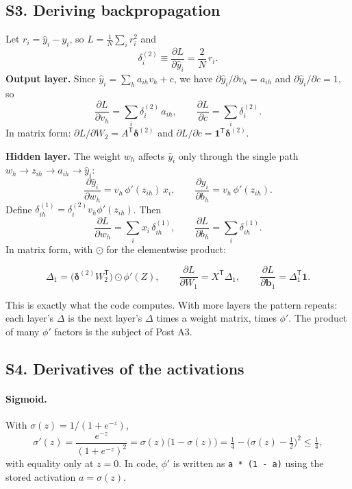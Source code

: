 \documentclass[11pt]{article}
\newcommand{\T}{\mathsf{T}}
\begin{document}
\label{sec:S3}
\subsection*{S3. Deriving backpropagation}
Let $r_i=\hat y_i-y_i$, so $L=\frac1N\sum_ir_i^2$ and
\[
  \delta^{(2)}_i\equiv\frac{\partial L}{\partial\hat y_i}=\frac2N\,r_i .
\]
\textbf{Output layer.} Since $\hat y_i=\sum_ha_{ih}v_h+c$, we have $\partial\hat y_i/\partial v_h=a_{ih}$ and $\partial\hat y_i/\partial c=1$, so
\[
  \frac{\partial L}{\partial v_h}=\sum_i\delta^{(2)}_i\,a_{ih},\qquad
  \frac{\partial L}{\partial c}=\sum_i\delta^{(2)}_i .
\]
In matrix form: $\partial L/\partial W_2=A^{\T}\bm\delta^{(2)}$ and $\partial L/\partial c=\mathbf 1^{\T}\bm\delta^{(2)}$.

\textbf{Hidden layer.} The weight $w_h$ affects $\hat y_i$ only through the single path $w_h\to z_{ih}\to a_{ih}\to\hat y_i$:
\[
  \frac{\partial\hat y_i}{\partial w_h}
  =v_h\,\phi'(z_{ih})\,x_i,
  \qquad
  \frac{\partial\hat y_i}{\partial b_h}
  =v_h\,\phi'(z_{ih}).
\]
Define $\delta^{(1)}_{ih}=\delta^{(2)}_iv_h\phi'(z_{ih})$. Then
\[
  \frac{\partial L}{\partial w_h}=\sum_ix_i\,\delta^{(1)}_{ih},\qquad
  \frac{\partial L}{\partial b_h}=\sum_i\delta^{(1)}_{ih}.
\]
In matrix form, with $\odot$ for the elementwise product:
\begin{mathbox}
\[
  \Delta_1=\big(\bm\delta^{(2)}W_2^{\T}\big)\odot\phi'(Z),\qquad
  \frac{\partial L}{\partial W_1}=X^{\T}\Delta_1,\qquad
  \frac{\partial L}{\partial\mathbf b_1}=\Delta_1^{\T}\mathbf 1 .
\]
\end{mathbox}
This is exactly what the code computes. With more layers the pattern repeats: each layer's $\Delta$ is the next layer's $\Delta$ times a weight matrix, times $\phi'$. The product of many $\phi'$ factors is the subject of Post A3.

\subsection*{S4. Derivatives of the activations}
\paragraph{Sigmoid.} With $\sigma(z)=1/(1+e^{-z})$,
\[
  \sigma'(z)=\frac{e^{-z}}{(1+e^{-z})^2}=\sigma(z)\big(1-\sigma(z)\big)
  =\tfrac14-\big(\sigma(z)-\tfrac12\big)^2\le\tfrac14,
\]
with equality only at $z=0$. In code, $\phi'$ is written as \texttt{a * (1 - a)} using the stored activation $a=\sigma(z)$.
\end{document}
